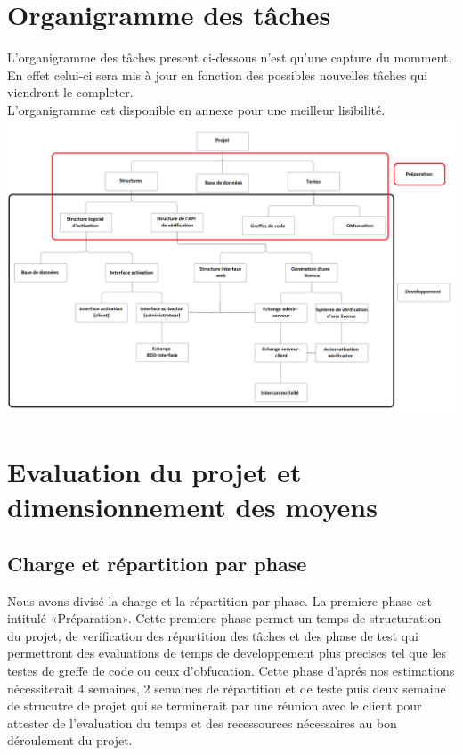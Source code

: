 \chapter{Organigramme des tâches}
L'organigramme des tâches present ci-dessous n'est qu'une capture du momment. En effet celui-ci sera mis à jour en fonction 
des possibles nouvelles tâches qui viendront le completer. \\

L'organigramme est disponible en annexe pour une meilleur lisibilité.\\ \newline
\includegraphics[width=18cm]{organi2png.png}

\chapter{Evaluation du projet et dimensionnement des moyens}
\section{Charge et répartition par phase}
Nous avons divisé la charge et la répartition par phase. La premiere phase est intitulé «Préparation». Cette premiere phase permet
un temps de structuration du projet, de verification des répartition des tâches et des phase de test qui permettront des evaluations de temps de
developpement plus precises tel que les testes de greffe de code ou ceux d'obfucation. Cette phase d'aprés nos estimations nécessiterait 4 semaines, 2 semaines de 
répartition et de teste puis deux semaine de strucutre de projet qui se terminerait par une réunion avec le client pour attester de l'evaluation du temps
et des recessources nécessaires au bon déroulement du projet.
\\ \newline

